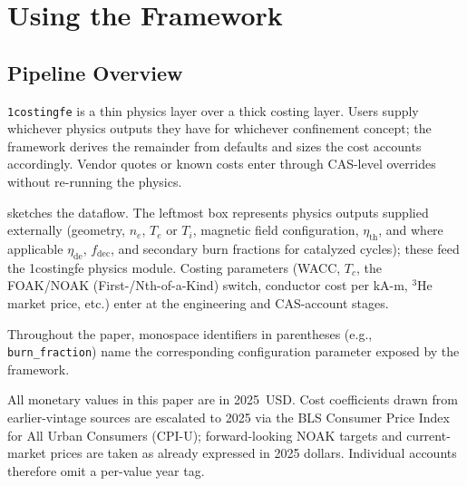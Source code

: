 \documentclass{article}
\begin{document}
\section{Using the Framework}
\label{sec:tour}

\subsection{Pipeline Overview}
\label{sec:tour-pipeline}

\texttt{1costingfe} is a thin physics layer over a thick costing
layer. Users supply whichever physics outputs they have for whichever
confinement concept; the framework derives the remainder from defaults
and sizes the cost accounts accordingly. Vendor quotes or known costs
enter through CAS-level overrides without re-running the physics.

 sketches the dataflow. The leftmost box
represents physics outputs supplied externally (geometry, $n_e$,
$T_e$ or $T_i$, magnetic field configuration, $\eta_{\text{th}}$,
and where applicable $\eta_{\text{de}}$, $f_{\text{dec}}$, and
secondary burn fractions for catalyzed cycles); these feed the
1costingfe physics module. Costing parameters (WACC, $T_c$, the
FOAK/NOAK (First-/Nth-of-a-Kind) switch, conductor cost per kA-m,
${}^3$He market price, etc.) enter at the engineering and
CAS-account stages.

Throughout the paper, monospace identifiers in parentheses (e.g.,
\texttt{burn\_fraction}) name the corresponding configuration
parameter exposed by the framework.

All monetary values in this paper are in 2025~USD. Cost coefficients
drawn from earlier-vintage sources are escalated to 2025 via the BLS
Consumer Price Index for All Urban Consumers (CPI-U); forward-looking
NOAK targets and current-market prices are taken as already expressed
in 2025 dollars. Individual accounts therefore omit a per-value year
tag.
\end{document}
